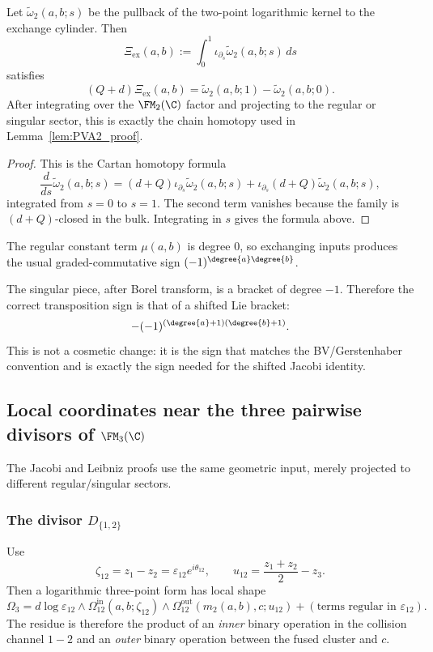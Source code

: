 \begin{proposition}
\label{prop:cylinder-homotopy-formula}
Let $\widetilde\omega_2(a,b;s)$ be the pullback of the two-point logarithmic kernel to
the exchange cylinder. Then
\[
\Xi_{\mathrm{ex}}(a,b):=\int_0^1 \iota_{\partial_s}\widetilde\omega_2(a,b;s)\,ds
\]
satisfies
\[
(Q+d)\Xi_{\mathrm{ex}}(a,b)
=
\widetilde\omega_2(a,b;1)-\widetilde\omega_2(a,b;0).
\]
After integrating over the $\FM_2(\C)$ factor and projecting to the regular or singular
sector, this is exactly the chain homotopy used in
Lemma~\ref{lem:PVA2_proof}.
\end{proposition}

\begin{proof}
This is the Cartan homotopy formula
\[
\frac{d}{ds}\widetilde\omega_2(a,b;s)
=
(d+Q)\iota_{\partial_s}\widetilde\omega_2(a,b;s)
+
\iota_{\partial_s}(d+Q)\widetilde\omega_2(a,b;s),
\]
integrated from $s=0$ to $s=1$. The second term vanishes because the family is
$(d+Q)$-closed in the bulk. Integrating in $s$ gives the formula above.
\end{proof}

\begin{remark}
The regular constant term $\mu(a,b)$ is degree $0$, so exchanging inputs produces the
usual graded-commutative sign $(-1)^{\degree{a}\degree{b}}$.

The singular piece, after Borel transform, is a bracket of degree $-1$. Therefore the
correct transposition sign is that of a shifted Lie bracket:
\[
-(-1)^{(\degree{a}+1)(\degree{b}+1)}.
\]
This is not a cosmetic change: it is the sign that matches the BV/Gerstenhaber
convention and is exactly the sign needed for the shifted Jacobi identity.
\end{remark}

\subsection{Local coordinates near the three pairwise divisors of $\FM_3(\C)$}

The Jacobi and Leibniz proofs use the same geometric input, merely projected
to different regular/singular sectors.

\subsubsection*{The divisor $D_{\{1,2\}}$}

Use
\[
\zeta_{12}=z_1-z_2=\varepsilon_{12}e^{i\theta_{12}},
\qquad
u_{12}=\frac{z_1+z_2}{2}-z_3.
\]
Then a logarithmic three-point form has local shape
\begin{equation}
\label{eq:local-D12}
\Omega_3
=
d\log\varepsilon_{12}\wedge
\Omega_{12}^{\mathrm{in}}(a,b;\zeta_{12})
\wedge
\Omega_{12}^{\mathrm{out}}(m_2(a,b),c;u_{12})
+
(\text{terms regular in }\varepsilon_{12}).
\end{equation}
The residue is therefore the product of an \emph{inner} binary operation in the
collision channel $1\!-\!2$ and an \emph{outer} binary operation between the fused
cluster and $c$.


